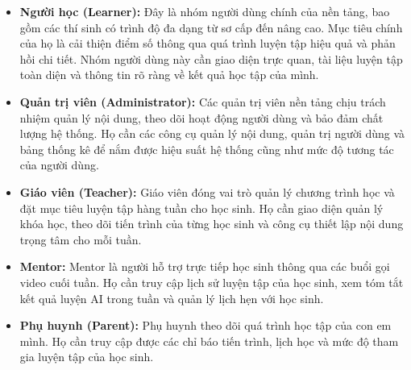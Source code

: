 \begin{itemize}
\item \textbf{Người học (Learner):} Đây là nhóm người dùng chính của nền tảng, bao gồm các thí sinh có trình độ đa dạng từ sơ cấp đến nâng cao. Mục tiêu chính của họ là cải thiện điểm số thông qua quá trình luyện tập hiệu quả và phản hồi chi tiết. Nhóm người dùng này cần giao diện trực quan, tài liệu luyện tập toàn diện và thông tin rõ ràng về kết quả học tập của mình.

\item \textbf{Quản trị viên (Administrator):} Các quản trị viên nền tảng chịu trách nhiệm quản lý nội dung, theo dõi hoạt động người dùng và bảo đảm chất lượng hệ thống. Họ cần các công cụ quản lý nội dung, quản trị người dùng và bảng thống kê để nắm được hiệu suất hệ thống cũng như mức độ tương tác của người dùng.

\item \textbf{Giáo viên (Teacher):} Giáo viên đóng vai trò quản lý chương trình học và đặt mục tiêu luyện tập hàng tuần cho học sinh. Họ cần giao diện quản lý khóa học, theo dõi tiến trình của từng học sinh và công cụ thiết lập nội dung trọng tâm cho mỗi tuần.

\item \textbf{Mentor:} Mentor là người hỗ trợ trực tiếp học sinh thông qua các buổi gọi video cuối tuần. Họ cần truy cập lịch sử luyện tập của học sinh, xem tóm tắt kết quả luyện AI trong tuần và quản lý lịch hẹn với học sinh.

\item \textbf{Phụ huynh (Parent):} Phụ huynh theo dõi quá trình học tập của con em mình. Họ cần truy cập được các chỉ báo tiến trình, lịch học và mức độ tham gia luyện tập của học sinh.
\end{itemize}

